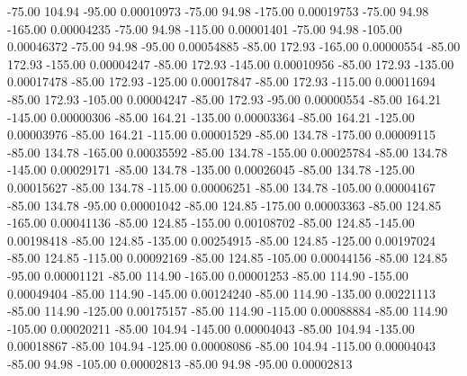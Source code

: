     -75.00    104.94    -95.00     0.00010973
    -75.00     94.98   -175.00     0.00019753
    -75.00     94.98   -165.00     0.00004235
    -75.00     94.98   -115.00     0.00001401
    -75.00     94.98   -105.00     0.00046372
    -75.00     94.98    -95.00     0.00054885
    -85.00    172.93   -165.00     0.00000554
    -85.00    172.93   -155.00     0.00004247
    -85.00    172.93   -145.00     0.00010956
    -85.00    172.93   -135.00     0.00017478
    -85.00    172.93   -125.00     0.00017847
    -85.00    172.93   -115.00     0.00011694
    -85.00    172.93   -105.00     0.00004247
    -85.00    172.93    -95.00     0.00000554
    -85.00    164.21   -145.00     0.00000306
    -85.00    164.21   -135.00     0.00003364
    -85.00    164.21   -125.00     0.00003976
    -85.00    164.21   -115.00     0.00001529
    -85.00    134.78   -175.00     0.00009115
    -85.00    134.78   -165.00     0.00035592
    -85.00    134.78   -155.00     0.00025784
    -85.00    134.78   -145.00     0.00029171
    -85.00    134.78   -135.00     0.00026045
    -85.00    134.78   -125.00     0.00015627
    -85.00    134.78   -115.00     0.00006251
    -85.00    134.78   -105.00     0.00004167
    -85.00    134.78    -95.00     0.00001042
    -85.00    124.85   -175.00     0.00003363
    -85.00    124.85   -165.00     0.00041136
    -85.00    124.85   -155.00     0.00108702
    -85.00    124.85   -145.00     0.00198418
    -85.00    124.85   -135.00     0.00254915
    -85.00    124.85   -125.00     0.00197024
    -85.00    124.85   -115.00     0.00092169
    -85.00    124.85   -105.00     0.00044156
    -85.00    124.85    -95.00     0.00001121
    -85.00    114.90   -165.00     0.00001253
    -85.00    114.90   -155.00     0.00049404
    -85.00    114.90   -145.00     0.00124240
    -85.00    114.90   -135.00     0.00221113
    -85.00    114.90   -125.00     0.00175157
    -85.00    114.90   -115.00     0.00088884
    -85.00    114.90   -105.00     0.00020211
    -85.00    104.94   -145.00     0.00004043
    -85.00    104.94   -135.00     0.00018867
    -85.00    104.94   -125.00     0.00008086
    -85.00    104.94   -115.00     0.00004043
    -85.00     94.98   -105.00     0.00002813
    -85.00     94.98    -95.00     0.00002813